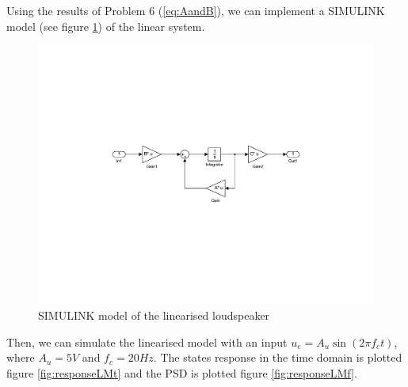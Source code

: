 Using the results of Problem 6 (\ref{eq:AandB}), we can implement a SIMULINK model (see figure \ref{fig:linearModelMatrix}) of the linear system.

\begin{figure}[H]
 \centering 
 \includegraphics[trim=5cm 7cm 2cm 7cm, clip=true, totalheight=0.25\textheight, angle=0]{figures/linearModelMatrix.pdf}
 \caption{SIMULINK model of the linearised loudspeaker}
\label{fig:linearModelMatrix}
\end{figure}

Then, we can simulate the linearised model with an input $u_e=A_u\sin(2\pi f_ct)$, where $A_u=5V$ and $f_c=20Hz$. The states response in the time domain is plotted figure \ref{fig:responseLMt} and the PSD is plotted figure \ref{fig:responseLMf}.

